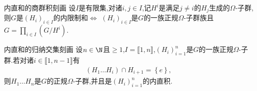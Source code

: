 \begin{proposition}{内直和的商群积刻画}{}
	设$I$是有限集,对诸$i,j\in I$,记$H^{i}$是满足$j\neq i$的$H_{j}$生成的$\Omega$-子群,则$G$是$\left(H_{i}\right)_{i\in I}$的内限制和$\iff$ $\left(H_{i}\right)_{i\in I}$是$G$的一族正规$\Omega$-子群族且$G=\prod\limits_{i\in I}\left(G/H^{i}\right)$.
\end{proposition}

\begin{proposition}{内直和的归纳交集刻画}{}
	设$n\in\N$且$\geq 1$,$I=\llbracket 1,n\rrbracket$,$\left(H_{i}\right)_{i=1}^{n}$是$G$的一族正规$\Omega$-子群.若对诸$i\in\llbracket 1,n-1\rrbracket$有
	\begin{align*}
		\left(H_{1}\ldots H_{i}\right)\cap H_{i+1}=\left\{e\right\},
	\end{align*}
	则$H_{1}\ldots H_{n}$是$G$的正规$\Omega$-子群,并且是$\left(H_{i}\right)_{i=1}^{n}$的内直积.
\end{proposition}













